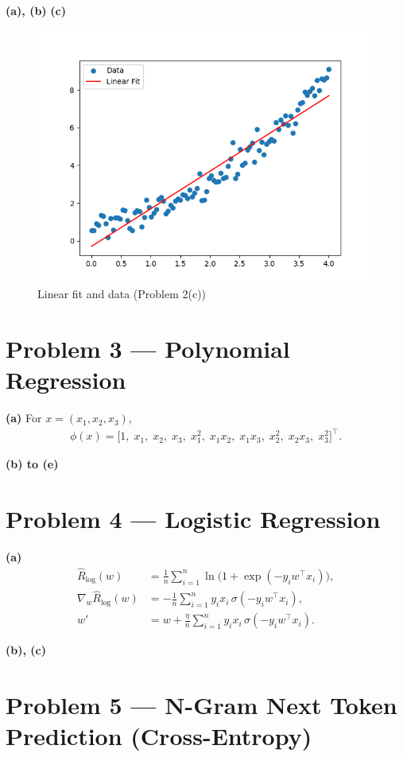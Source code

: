 \documentclass[11pt]{article}
\begin{document}
\noindent\textbf{(a), (b)} 
\noindent\textbf{(c)} 

\begin{figure}[H]
  \centering
  \includegraphics[width=0.7\linewidth]{2-c-output.png}
  \caption{Linear fit and data (Problem 2(c))}
  \label{fig:2c-linear-fit}
\end{figure}

\section*{Problem 3 --- Polynomial Regression}

\noindent\textbf{(a)} For $x=(x_1,x_2,x_3)$,
\begin{align*}
\phi(x) = \big[1,\; x_1,\; x_2,\; x_3,\; x_1^2,\; x_1x_2,\; x_1x_3,\; x_2^2,\; x_2x_3,\; x_3^2\big]^\top.
\end{align*}

\noindent\textbf{(b) to (e)} 

\section*{Problem 4 --- Logistic Regression}

\noindent\textbf{(a)} 
\begin{align*}
\hat R_{\log}(w) &= \frac1n \sum_{i=1}^n \ln\!\big(1+\exp(-y_i w^\top x_i)\big), \\
\nabla_w \hat R_{\log}(w) &= -\frac1n\sum_{i=1}^n y_i x_i\,\sigma(-y_i w^\top x_i), \\
w' &= w + \frac{\eta}{n}\sum_{i=1}^n y_i x_i\,\sigma(-y_i w^\top x_i).
\end{align*}

\noindent\textbf{(b), (c)} 

\section*{Problem 5 --- N-Gram Next Token Prediction (Cross-Entropy)}
\end{document}
